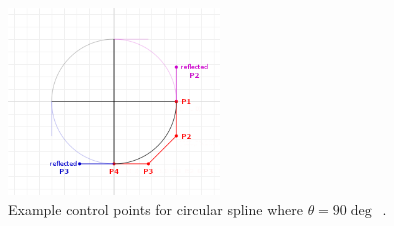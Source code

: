 \begin{figure}[h]
    \centering
    \includegraphics[width=0.5\textwidth]{content/4_3_autoNavigation/img/ControlPointsReflected}
    \caption{Example control points for circular spline where $\theta = 90\deg$~\cite{Poxmax2021}.}
    \label{fig:orbital-reflected-points}
\end{figure}

